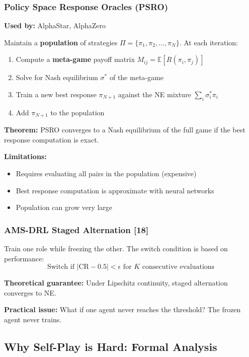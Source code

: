 \documentclass[11pt,a4paper]{report}
\begin{document}
\subsubsection{Policy Space Response Oracles (PSRO)}

\textbf{Used by:} AlphaStar, AlphaZero

Maintain a \textbf{population} of strategies $\Pi = \{\pi_1, \pi_2, \ldots, \pi_N\}$. At each iteration:
\begin{enumerate}
    \item Compute a \textbf{meta-game} payoff matrix $M_{ij} = \mathbb{E}[R(\pi_i, \pi_j)]$
    \item Solve for Nash equilibrium $\sigma^*$ of the meta-game
    \item Train a new best response $\pi_{N+1}$ against the NE mixture $\sum_i \sigma^*_i \pi_i$
    \item Add $\pi_{N+1}$ to the population
\end{enumerate}

\textbf{Theorem:} PSRO converges to a Nash equilibrium of the full game if the best response computation is exact.

\textbf{Limitations:}
\begin{itemize}
    \item Requires evaluating all pairs in the population (expensive)
    \item Best response computation is approximate with neural networks
    \item Population can grow very large
\end{itemize}

\subsubsection{AMS-DRL Staged Alternation [18]}

Train one role while freezing the other. The switch condition is based on performance:
\begin{equation}
    \text{Switch if } |\text{CR} - 0.5| < \epsilon \text{ for } K \text{ consecutive evaluations}
\end{equation}

\textbf{Theoretical guarantee:} Under Lipschitz continuity, staged alternation converges to NE.

\textbf{Practical issue:} What if one agent never reaches the threshold? The frozen agent never trains.

\subsection{Why Self-Play is Hard: Formal Analysis}
\end{document}
